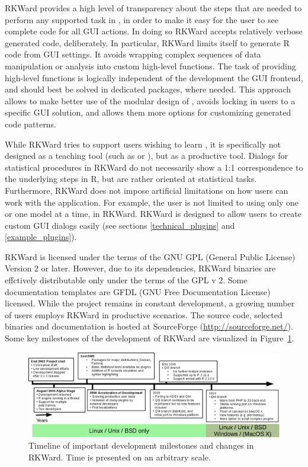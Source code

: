 RKWard provides a high level of transparency about the steps that are needed to
perform any supported task in , in order to make it easy for the user to see
complete code for all GUI actions. In doing so RKWard accepts relatively verbose
generated code, deliberately. In particular, RKWard limits itself to generate R
code from GUI settings. It avoids wrapping complex sequences of data
manipulation or analysis into custom high-level  functions. The task of
providing high-level functions is logically independent of the development the
GUI frontend, and should best be solved in dedicated  packages, where needed.
This approach allows to make better use of the modular design of , avoids
locking in users to a specific GUI solution, and allows them more options for
customizing generated code patterns.

While RKWard tries to support users wishing to learn , it is specifically not
designed as a teaching tool (such as  or ), but as
a productive tool. Dialogs for statistical procedures in RKWard do not
necessarily show a 1:1 correspondence to the underlying steps in R, but are
rather oriented at statistical tasks. Furthermore, RKWard does not impose
artificial limitations on how users can work with the application. For example,
the user is not limited to using only one  or one model at a
time, in RKWard. RKWard is designed to allow users to create custom GUI dialogs
easily (see sections \ref{technical_plugins} and \ref{example_plugins}).

RKWard is licensed under the terms of the GNU GPL (General Public License) Version 2
or later. However, due to its dependencies, RKWard binaries are effctively
distributable only under the terms of the GPL v 2. Some documentation templates are
GFDL (GNU Free Documentation License) licensed. While the project remains in constant development, a growing
number of users employs RKWard in productive scenarios. The source code,
selected binaries and documentation is hosted at SourceForge
(\url{http://sourceforge.net/}). Some key milestones of the development of RKWard are
visualized in Figure~\ref{fig:timeline}.

\begin{figure}[htp]
 \centering
 \includegraphics{../figures/timeline.png}
 \caption{Timeline of important development milestones and changes in RKWard.
          Time is presented on an arbitrary scale.}
 \label{fig:timeline}
\end{figure}


